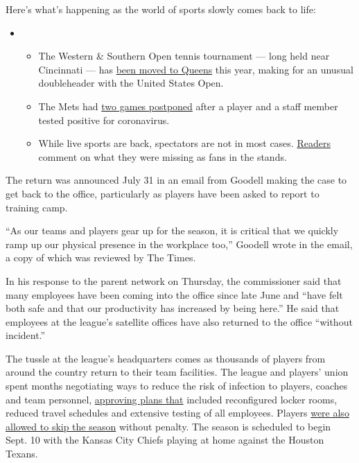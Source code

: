 Here's what's happening as the world of sports slowly comes back to
life:

\begin{itemize}
\item
  \begin{itemize}
  \tightlist
  \item
    The Western \& Southern Open tennis tournament --- long held near
    Cincinnati --- has
    \href{https://www.nytimes3xbfgragh.onion/2020/08/21/sports/tennis-most-ambitious-doubleheader-in-years-is-underway.html?action=click\&pgtype=Article\&state=default\&region=MAIN_CONTENT_2\&context=storylines_keepup}{been
    moved to Queens} this year, making for an unusual doubleheader with
    the United States Open.
  \item
    The Mets had
    \href{https://www.nytimes3xbfgragh.onion/2020/08/20/sports/baseball/mets-postponed-coronavirus.html?action=click\&pgtype=Article\&state=default\&region=MAIN_CONTENT_2\&context=storylines_keepup}{two
    games postponed} after a player and a staff member tested positive
    for coronavirus.
  \item
    While live sports are back, spectators are not in most cases.
    \href{https://www.nytimes3xbfgragh.onion/2020/08/19/sports/empty-stadiums-live-fans.html?action=click\&pgtype=Article\&state=default\&region=MAIN_CONTENT_2\&context=storylines_keepup}{Readers}
    comment on what they were missing as fans in the stands.
  \end{itemize}
\end{itemize}

The return was announced July 31 in an email from Goodell making the
case to get back to the office, particularly as players have been asked
to report to training camp.

``As our teams and players gear up for the season, it is critical that
we quickly ramp up our physical presence in the workplace too,'' Goodell
wrote in the email, a copy of which was reviewed by The Times.

In his response to the parent network on Thursday, the commissioner said
that many employees have been coming into the office since late June and
``have felt both safe and that our productivity has increased by being
here.'' He said that employees at the league's satellite offices have
also returned to the office ``without incident.''

The tussle at the league's headquarters comes as thousands of players
from around the country return to their team facilities. The league and
players' union spent months negotiating ways to reduce the risk of
infection to players, coaches and team personnel,
\href{https://www.nytimes3xbfgragh.onion/2020/07/14/sports/football/nfl-players-training-camp.html}{approving
plans that} included reconfigured locker rooms, reduced travel schedules
and extensive testing of all employees. Players
\href{https://www.nytimes3xbfgragh.onion/2020/07/24/sports/football/nfl-players-regular-season-start.html}{were
also allowed to skip the season} without penalty. The season is
scheduled to begin Sept. 10 with the Kansas City Chiefs playing at home
against the Houston Texans.

